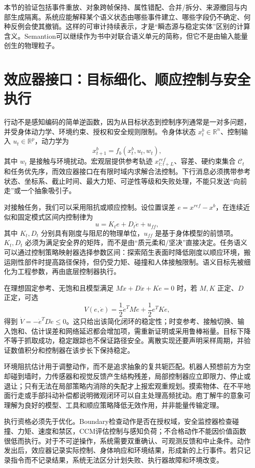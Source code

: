 本节的验证包括事件重放、对象跨帧保持、属性错配、合并/拆分、来源撤回与内部生成隔离。系统应能解释某个语义状态由哪些事件建立、哪些字段仍不确定、何种反例会使其撤销。这样的可审计持续表示，才是“瞬态源与稳定实体”区别的计算含义。Semantion可以继续作为书中对联合语义单元的简称，但它不是由输入能量创生的物理粒子。

\section{效应器接口：目标细化、顺应控制与安全执行}
\label{sec:section_5244}

行动不是感知编码的简单逆函数，因为从目标状态到控制序列通常是一对多问题，并受身体动力学、环境约束、授权和安全规则限制。令身体状态 $x_t^b\in\mathbb{R}^{n}$、控制输入 $u_t\in\mathbb{R}^{p}$，动力学为
\[
x_{t+1}^b=f_b(x_t^b,u_t,w_t),
\]
其中 $w_t$ 是接触与环境扰动。宏观层提供参考轨迹 $x_{t:t+L}^{ref}$、容差、硬约束集合 $\mathcal C_t$ 和任务优先序，而效应器接口在有限时域内求解合法控制。下行消息必须携带参考状态、坐标系、截止时间、最大力矩、可逆性等级和失败处理，不能只发送“向前走”或一个抽象吸引子。

对接触任务，我们可以采用阻抗或顺应控制。设位置误差 $e=x^{ref}-x^b$，在连续近似和固定模式区间内控制律为
\[
u=K_t e+D_t\dot e+u_{ff},
\]
其中 $K_t,D_t$ 分别具有刚度与阻尼的物理单位，$u_{ff}$ 是基于身体模型的前馈项。$K_t,D_t$ 必须为满足安全界的矩阵，而不是由“质元柔和/坚决”直接决定。任务语义可以通过控制策略映射器选择参数区间：探索陌生表面时降低刚度以顺应环境，搬运刚性部件时提高路径保持，但仍受力矩、碰撞和人体接触限制。语义目标先被细化为工程参数，再由底层控制器执行。

在理想固定参考、无饱和且模型满足 $M\ddot x+D\dot x+Ke=0$ 时，若 $M,K$ 正定、$D$ 正定，可选
\[
V(e,\dot e)=\frac12\dot e^TM\dot e+\frac12e^TKe,
\]
得到 $\dot V=-\dot e^TD\dot e\leq0$。这只给出该简化闭环的稳定性；时变参考、接触切换、输入饱和、估计误差和网络延迟都会增加项，需重新证明或采用鲁棒裕量。目标下降不等于抓取成功，稳定跟踪也不保证路径安全。离散实现还要声明采样周期，并验证数值积分和控制器在该步长下保持稳定。

环境阻抗估计用于调整动作，而不是追求抽象的复共轭匹配。机器人预想前方为空却碰到墙时，力传感器和视觉反馈产生结构残差，局部控制器应立即限力、停止或退让；只有无法在局部策略内消除的失配才上报宏观重规划。摸索物体、在不平地面行走或手部抖动补偿都说明微观闭环可以自主处理高频扰动。庖丁解牛的意象可理解为良好的模型、工具和顺应策略降低无效作用，并非能量传输定理。

执行资格必须先于优化。Boundary检查动作是否在授权域，安全监控器检查碰撞、力矩、速度和禁区，CCM评估控制与感知负荷；不合格动作不能因价值函数很低而执行。对于不可逆操作，系统需要双重确认、可观测反馈和中止条件。动作发出后，效应器记录实际控制、身体响应和环境结果，形成新的上行事件。若只记录指令而不记录结果，系统无法区分计划失败、执行器故障和环境改变。


